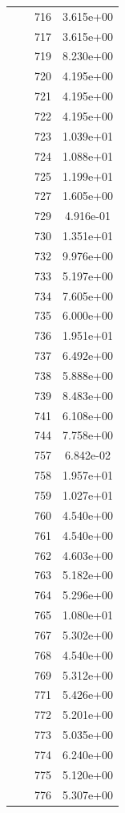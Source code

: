 \documentclass[12pt]{article}
\begin{document}
\begin{longtable}{@{}cccc@{}}
 &  & 716 & 3.615e+00 \\
 &  & 717 & 3.615e+00 \\
 &  & 719 & 8.230e+00 \\
 &  & 720 & 4.195e+00 \\
 &  & 721 & 4.195e+00 \\
 &  & 722 & 4.195e+00 \\
 &  & 723 & 1.039e+01 \\
 &  & 724 & 1.088e+01 \\
 &  & 725 & 1.199e+01 \\
 &  & 727 & 1.605e+00 \\
 &  & 729 & 4.916e-01 \\
 &  & 730 & 1.351e+01 \\
 &  & 732 & 9.976e+00 \\
 &  & 733 & 5.197e+00 \\
 &  & 734 & 7.605e+00 \\
 &  & 735 & 6.000e+00 \\
 &  & 736 & 1.951e+01 \\
 &  & 737 & 6.492e+00 \\
 &  & 738 & 5.888e+00 \\
 &  & 739 & 8.483e+00 \\
 &  & 741 & 6.108e+00 \\
 &  & 744 & 7.758e+00 \\
 &  & 757 & 6.842e-02 \\
 &  & 758 & 1.957e+01 \\
 &  & 759 & 1.027e+01 \\
 &  & 760 & 4.540e+00 \\
 &  & 761 & 4.540e+00 \\
 &  & 762 & 4.603e+00 \\
 &  & 763 & 5.182e+00 \\
 &  & 764 & 5.296e+00 \\
 &  & 765 & 1.080e+01 \\
 &  & 767 & 5.302e+00 \\
 &  & 768 & 4.540e+00 \\
 &  & 769 & 5.312e+00 \\
 &  & 771 & 5.426e+00 \\
 &  & 772 & 5.201e+00 \\
 &  & 773 & 5.035e+00 \\
 &  & 774 & 6.240e+00 \\
 &  & 775 & 5.120e+00 \\
 &  & 776 & 5.307e+00 \\

\end{longtable}
\end{document}
